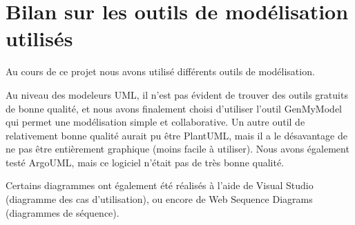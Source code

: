 \documentclass[a4paper, 11pt, titlepage]{article}
\begin{document}
\section {Bilan sur les outils de modélisation utilisés}

Au cours de ce projet nous avons utilisé différents outils de modélisation.

Au niveau des modeleurs UML, il n'est pas évident de trouver des outils gratuits de bonne qualité, et nous avons finalement choisi d'utiliser l'outil GenMyModel qui permet une modélisation simple et collaborative. Un autre outil de relativement bonne qualité aurait pu être PlantUML, mais il a le désavantage de ne pas être entièrement graphique (moins facile à utiliser). Nous avons également testé ArgoUML, mais ce logiciel n'était pas de très bonne qualité.

Certains diagrammes ont également été réalisés à l'aide de Visual Studio (diagramme des cas d'utilisation), ou encore de Web Sequence Diagrams (diagrammes de séquence).
\end{document}
